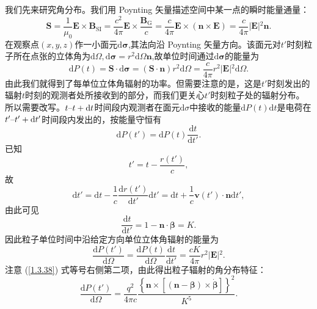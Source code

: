 \documentclass[../天体物理基础.tex]{subfiles}
\begin{document}
我们先来研究角分布。我们用 Poynting 矢量描述空间中某一点的瞬时能量通量：
\begin{equation}
\boldsymbol{S}=\frac{1}{\mu_{0}}\boldsymbol{E}\times\boldsymbol{B}_{\text{SI}}=\frac{c^{2}}{4\pi}\boldsymbol{E}\times\frac{\boldsymbol{B}_{\text{G}}}{c}=\frac{c}{4\pi}\boldsymbol{E}\times\left(\boldsymbol{n}\times\boldsymbol{E}\right)=\frac{c}{4\pi}\left\vert{}\boldsymbol{E}\right\vert{}^{2}\boldsymbol{n}.
\end{equation}
在观察点$\left(x,y,z\right)$作一小面元$\mathrm{d}\boldsymbol{\sigma}$,其法向沿 Poynting 矢量方向。该面元对$t'$时刻粒子所在点张的立体角为$\mathrm{d}\Omega,\mathrm{d}\boldsymbol{\sigma}=r^{2}\mathrm{d}\Omega\boldsymbol{n}$,故单位时间通过$\mathrm{d}\boldsymbol{\sigma}$的能量为
\begin{equation}
\mathrm{d}P\left(t\right)=\boldsymbol{S}\cdot\mathrm{d}\boldsymbol{\sigma}=\left(\boldsymbol{S}\cdot\boldsymbol{n}\right)r^{2}\mathrm{d}\Omega=\frac{c}{4\pi}r^{2}\left\vert{}\boldsymbol{E}\right\vert{}^{2}\mathrm{d}\Omega.
\end{equation}
由此我们就得到了每单位立体角辐射的功率。但需要注意的是，这是$t'$时刻发出的辐射$t$时刻的观测者处所接收到的部分，而我们更关心$t'$时刻粒子处的辐射分布。所以需要改写。$t\text{\textendash}t+\mathrm{d}t$时间段内观测者在面元$\mathrm{d}\sigma$中接收的能量$\mathrm{d}P\left(t\right)\mathrm{d}t$是电荷在$t'\text{\textendash}t'+\mathrm{d}t'$时间段内发出的，按能量守恒有
\begin{equation}
\mathrm{d}P\left(t'\right)=\mathrm{d}P\left(t\right)\frac{\mathrm{d}t}{\mathrm{d}t'}.
\end{equation}
已知
\begin{equation}
t'=t-\frac{r\left(t'\right)}{c},
\end{equation}
故
\begin{equation}
\mathrm{d}t'=\mathrm{d}t-\frac{1}{c}\frac{\mathrm{d}r\left(t'\right)}{\mathrm{d}t'}\mathrm{d}t'=\mathrm{d}t+\frac{1}{c}\boldsymbol{v}\left(t'\right)\cdot\boldsymbol{n}\mathrm{d}t',
\end{equation}
由此可见
\begin{equation}
\frac{\mathrm{d}t}{\mathrm{d}t'}=1-\boldsymbol{n}\cdot\boldsymbol{\beta}=K.
\end{equation}
因此粒子单位时间中沿给定方向单位立体角辐射的能量为
\begin{equation}
\frac{\mathrm{d}P\left(t'\right)}{\mathrm{d}\Omega}=\frac{\mathrm{d}P\left(t\right)}{\mathrm{d}\Omega}\frac{\mathrm{d}t}{\mathrm{d}t'}=\frac{cK}{4\pi}r^{2}\left\vert{}\boldsymbol{E}\right\vert{}^{2}.
\end{equation}
注意 (\ref{1.3.38}) 式等号右侧第二项，由此得出粒子辐射的角分布特征：
\begin{equation}
\frac{\mathrm{d}P\left(t'\right)}{\mathrm{d}\Omega}=\frac{q^{2}}{4\pi c}\frac{\left\{\boldsymbol{n}\times\left[\left(\boldsymbol{n}-\boldsymbol{\beta}\right)\times\dot{\boldsymbol{\beta}}\right]\right\}^{2}}{K^{5}}.\label{1.3.46}
\end{equation}
\end{document}
